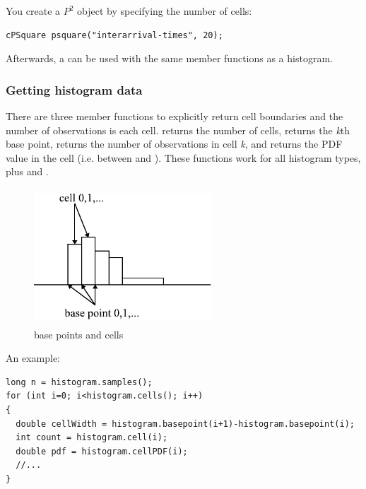 You create a $P^{2}$ object by specifying the number of cells:

\begin{verbatim}
cPSquare psquare("interarrival-times", 20);
\end{verbatim}

Afterwards, a  can be used with the same member functions
as a histogram.


\subsubsection{Getting histogram data}


There are three member functions to explicitly return cell boundaries
and the number of observations is each cell.  returns
the number of cells,  returns the
\textit{k}th base point,  returns the
number of observations in cell \textit{k}, and
 returns the PDF value in the cell
(i.e. between  and
).  These functions work for all
histogram types, plus  and .

\begin{figure}[htbp]
  \begin{center}
    \includegraphics[width=2.615in, height=2.001in]{figures/usmanFig14}
    \caption{base points and cells}
  \end{center}
\end{figure}

An example:

\begin{verbatim}
long n = histogram.samples();
for (int i=0; i<histogram.cells(); i++)
{
  double cellWidth = histogram.basepoint(i+1)-histogram.basepoint(i);
  int count = histogram.cell(i);
  double pdf = histogram.cellPDF(i);
  //...
}
\end{verbatim}


